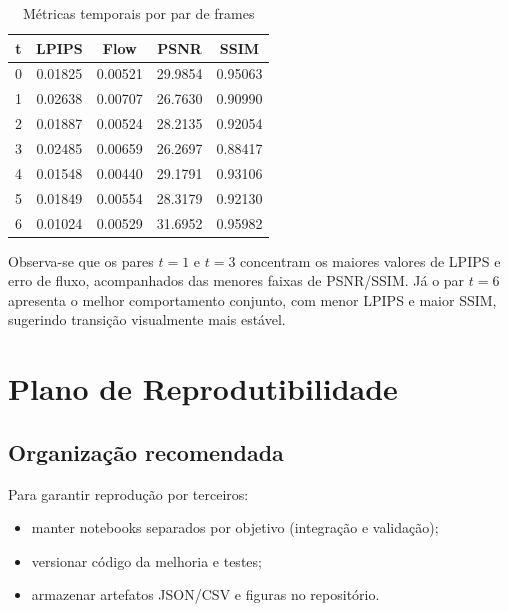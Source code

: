 \documentclass[conference]{IEEEtran}
\begin{document}
\begin{table}[H]
\caption{Métricas temporais por par de frames}
\label{tab:pairs_detalhado}
\centering
\begin{tabular}{ccccc}
\toprule
\textbf{t} & \textbf{LPIPS} & \textbf{Flow} & \textbf{PSNR} & \textbf{SSIM} \\
\midrule
0 & 0.01825 & 0.00521 & 29.9854 & 0.95063 \\
1 & 0.02638 & 0.00707 & 26.7630 & 0.90990 \\
2 & 0.01887 & 0.00524 & 28.2135 & 0.92054 \\
3 & 0.02485 & 0.00659 & 26.2697 & 0.88417 \\
4 & 0.01548 & 0.00440 & 29.1791 & 0.93106 \\
5 & 0.01849 & 0.00554 & 28.3179 & 0.92130 \\
6 & 0.01024 & 0.00529 & 31.6952 & 0.95982 \\
\bottomrule
\end{tabular}
\end{table}

Observa-se que os pares $t=1$ e $t=3$ concentram os maiores valores de LPIPS e erro de fluxo, acompanhados das menores faixas de PSNR/SSIM. Já o par $t=6$ apresenta o melhor comportamento conjunto, com menor LPIPS e maior SSIM, sugerindo transição visualmente mais estável.

\section{Plano de Reprodutibilidade}
\subsection{Organização recomendada}
Para garantir reprodução por terceiros:
\begin{itemize}
    \item manter notebooks separados por objetivo (integração e validação);
    \item versionar código da melhoria e testes;
    \item armazenar artefatos JSON/CSV e figuras no repositório.
\end{itemize}
\end{document}
